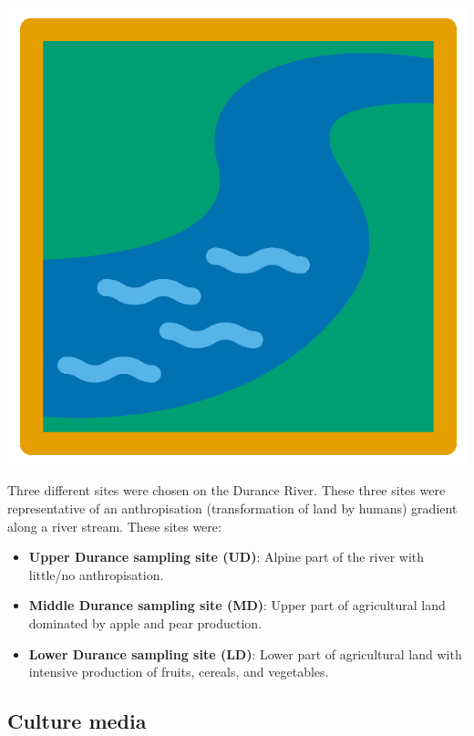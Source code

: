 \documentclass[
]{book}
\providecommand{\tightlist}{%
  \setlength{\itemsep}{0pt}\setlength{\parskip}{0pt}}
\begin{document}
\includegraphics{figures/river.png}

Three different sites were chosen on the Durance River. These three sites were representative of an anthropisation (transformation of land by humans) gradient along a river stream. These sites were:

\begin{itemize}
\tightlist
\item
  \textbf{Upper Durance sampling site (UD)}: Alpine part of the river with little/no anthropisation.
\item
  \textbf{Middle Durance sampling site (MD)}: Upper part of agricultural land dominated by apple and pear production.
\item
  \textbf{Lower Durance sampling site (LD)}: Lower part of agricultural land with intensive production of fruits, cereals, and vegetables.
\end{itemize}

\hypertarget{culture-media}{%
\subsection{Culture media}\label{culture-media}}
\end{document}
